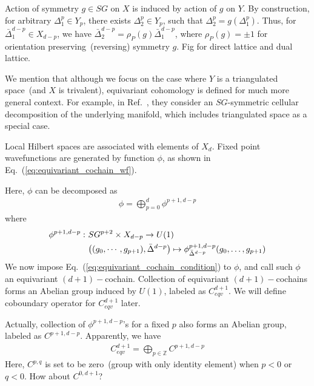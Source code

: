 \documentclass[%
 reprint,
 amsmath,amssymb,
 aps,pra,
]{revtex4-1}
\newcommand{\ZZ}{\mathbb{Z}} %
\begin{document}
Action of symmetry $g\in SG$ on $X$ is induced by action of $g$ on $Y$.
By construction, for arbitrary $\Delta^p_1\in Y_p$, there exists $\Delta^p_2\in Y_p$, such that $\Delta^p_2=g(\Delta^p_1)$.
Thus, for $\bar{\Delta}^{d-p}_1\in X_{d-p}$, we have $\bar{\Delta}_2^{d-p}=\rho_P(g)\bar{\Delta}^{d-p}_1$, where $\rho_P(g)=\pm1$ for orientation preserving~(reversing) symmetry $g$.
{\color{red} Fig for direct lattice and dual lattice.}

We mention that although we focus on the case where $Y$ is a triangulated space~(and $X$ is trivalent), equivariant cohomology is defined for much more general context. 
For example, in Ref.~\cite{SongFangQi2018SongFangQi2018,ElseThorngren2018crystalline}, they consider an $SG$-symmetric cellular decomposition of the underlying manifold, which includes triangulated space as a special case.

Local Hilbert spaces are associated with elements of $X_d$. 
Fixed point wavefunctions are generated by function $\phi$, as shown in Eq.~(\ref{eq:equivariant_cochain_wf}).

Here, $\phi$ can be decomposed as
\begin{align}
  \phi=\bigoplus_{p=0}^d\phi^{p+1,d-p}
  \label{}
\end{align}
where
\begin{align}
  \phi^{p+1,d-p}:~&SG^{p+2}\times X_{d-p}\rightarrow U(1)\notag\\
  &\big((g_0,\cdots,g_{p+1}),\bar{\Delta}^{d-p}\big) \mapsto \phi^{p+1,d-p}_{\bar{\Delta}^{d-p}}(g_0,\ldots,g_{p+1})
  \label{}
\end{align}
We now impose Eq.~(\ref{eq:equivariant_cochain_condition}) to $\phi$, and call such $\phi$ an equivariant $(d+1)-$cochain. 
Collection of equivariant $(d+1)-$cochains forms an Abelian group induced by $U(1)$, labeled as $C^{d+1}_{eqv}$. 
We will define coboundary operator for $C^{d+1}_{eqv}$ later.

Actually, collection of $\phi^{p+1,d-p}$'s for a fixed $p$ also forms an Abelian group, labeled as $C^{p+1,d-p}$.
Apparently, we have
\begin{align}
  C^{d+1}_{eqv}=\bigoplus_{p\in\ZZ} C^{p+1,d-p}
  \label{}
\end{align}
Here, $C^{p,q}$ is set to be zero~(group with only identity element) when $p<0$ or $q<0$.
{\color{red} How about $C^{0,d+1}$?}
\end{document}
